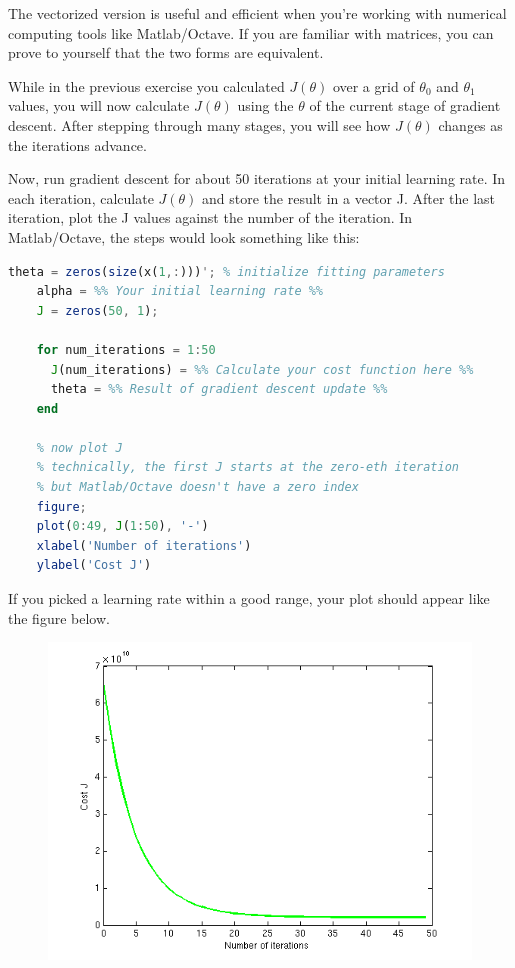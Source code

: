 \documentclass[10pt,a4paper]{article}
\begin{document}
  The vectorized version is useful and efficient when you're working with numerical computing tools like Matlab/Octave. If you are familiar with matrices, you can prove to yourself that the two forms are equivalent.

  While in the previous exercise you calculated $J(\theta)$ over a grid of $\theta_0$ and $\theta_1$ values, you will now calculate $J(\theta)$ using the $\theta$ of the current stage of gradient descent. After stepping through many stages, you will see how $J(\theta)$ changes as the iterations advance.

  Now, run gradient descent for about 50 iterations at your initial learning rate. In each iteration, calculate $J(\theta)$ and store the result in a vector J. After the last iteration, plot the J values against the number of the iteration. In Matlab/Octave, the steps would look something like this:
  \begin{lstlisting}[language=Octave, basicstyle=\footnotesize, showspaces=false]
    theta = zeros(size(x(1,:)))'; % initialize fitting parameters
    alpha = %% Your initial learning rate %%
    J = zeros(50, 1); 

    for num_iterations = 1:50
      J(num_iterations) = %% Calculate your cost function here %%
      theta = %% Result of gradient descent update %%
    end

    % now plot J
    % technically, the first J starts at the zero-eth iteration
    % but Matlab/Octave doesn't have a zero index
    figure;
    plot(0:49, J(1:50), '-')
    xlabel('Number of iterations')
    ylabel('Cost J')
  \end{lstlisting}


  If you picked a learning rate within a good range, your plot should appear like the figure below.
  \begin{figure}[htb!]
    \centering
      \includegraphics[width=.7\columnwidth]{ex3j1}
  \end{figure}
\end{document}
